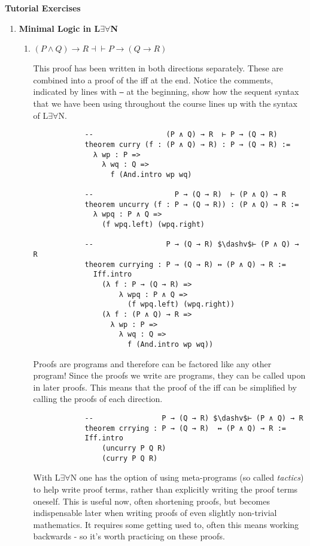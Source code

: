 \documentclass[11pt]{report}
\begin{document}
\newpage
{\bf Tutorial Exercises}
\begin{enumerate}

	\item \textbf{Minimal Logic in L$\exists\forall$N} 
	 
	\begin{enumerate}
		\item $( P\land  Q) \rightarrow  R \dashv\vdash  P\rightarrow ( Q \rightarrow  R) $
		
		This proof has been written in both directions separately. These are combined into a proof of the iff at the end. Notice the comments, indicated by lines with \texttt{---} at the beginning, show how the sequent syntax that we have been using throughout the course lines up with the syntax of L$\exists\forall$N. 
		
		\begin{lstlisting}
			--                 (P ∧ Q) → R  ⊢ P → (Q → R)
			theorem curry (f : (P ∧ Q) → R) : P → (Q → R) :=
			  λ wp : P =>
				λ wq : Q =>
				  f (And.intro wp wq)
			
			--                   P → (Q → R)  ⊢ (P ∧ Q) → R
			theorem uncurry (f : P → (Q → R)) : (P ∧ Q) → R :=
			  λ wpq : P ∧ Q =>
				(f wpq.left) (wpq.right)
			
			--                 P → (Q → R) $\dashv$⊢ (P ∧ Q) → R
			theorem currying : P → (Q → R) ↔ (P ∧ Q) → R :=
			  Iff.intro
				(λ f : P → (Q → R) =>
					λ wpq : P ∧ Q =>
					  (f wpq.left) (wpq.right))
				(λ f : (P ∧ Q) → R =>
				  λ wp : P =>
					λ wq : Q =>
					  f (And.intro wp wq))
		\end{lstlisting}

		Proofs are programs and therefore can be factored like any other program! Since the proofs we write are programs, they can be called upon in later proofs. This means that the proof of the iff can be simplified by calling the proofs of each direction. 

		\begin{lstlisting}
			--                P → (Q → R) $\dashv$⊢ (P ∧ Q) → R
			theorem crrying : P → (Q → R)  ↔ (P ∧ Q) → R :=
			Iff.intro
				(uncurry P Q R)
				(curry P Q R)
		\end{lstlisting}

		\newpage

		With L$\exists\forall$N one has the option of using meta-programs (so called \emph{tactics}) to help write proof terms, rather than explicitly writing the proof terms oneself. This is useful now, often shortening proofs, but becomes indispensable later when writing proofs of even slightly non-trivial mathematics. It requires some getting used to, often this means working backwards - so it's worth practicing on these proofs. 


\end{enumerate}
\end{enumerate}
\end{document}
